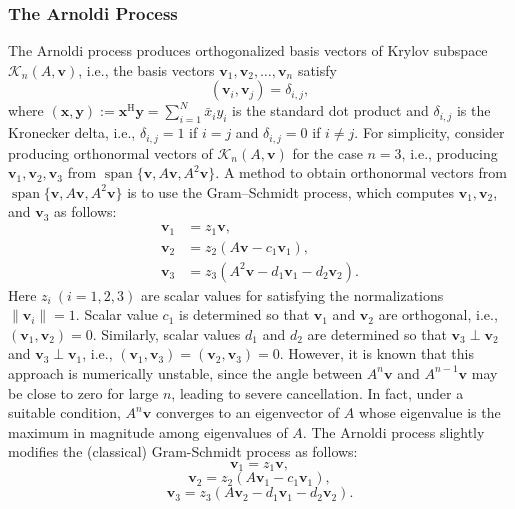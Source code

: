\subsubsection{{The Arnoldi Process}}\label{subsec:arnoldi-process}
{The Arnoldi process produces orthogonalized basis vectors of Krylov subspace $\mathcal K_n(A,\bm v)$, i.e., the basis vectors $\bm v_1,\bm v_2,\ldots,\bm v_n$ satisfy}
\[(\bm v_i,\bm v_j)=\delta_{i,j},\]
{where $(\bm x,\bm y):=\bm x^{\mathrm H}\bm y=\sum_{i=1}^N\bar x_i y_i$ is the standard dot product and $\delta_{i,j}$ is the Kronecker delta, i.e., $\delta_{i,j}=1$ if $i=j$ and $\delta_{i,j}=0$ if $i\ne j$.}
{For simplicity, consider producing orthonormal vectors of $\mathcal K_n(A,\bm v)$ for the case $n=3$, i.e., producing $\bm v_1,\bm v_2,\bm v_3$ from $\operatorname{span}\{\bm v,A\bm v,A^2\bm v\}$.}
{A method to obtain orthonormal vectors from $\operatorname{span}\{\bm v,A\bm v,A^2\bm v\}$ is to use the Gram--Schmidt process, which computes $\bm v_1,\bm v_2$, and $\bm v_3$ as follows:}
\[
\begin{aligned}
\bm v_1&=z_1\bm v,\\
\bm v_2&=z_2(A\bm v-c_1\bm v_1),\\
\bm v_3&=z_3(A^2\bm v-d_1\bm v_1-d_2\bm v_2).
\end{aligned}
\]
{Here $z_i\ (i=1,2,3)$ are scalar values for satisfying the normalizations $\|\bm v_i\|=1$. Scalar value $c_1$ is determined so that $\bm v_1$ and $\bm v_2$ are orthogonal, i.e., $(\bm v_1,\bm v_2)=0$. Similarly, scalar values $d_1$ and $d_2$ are determined so that $\bm v_3\perp\bm v_2$ and $\bm v_3\perp\bm v_1$, i.e., $(\bm v_1,\bm v_3)=(\bm v_2,\bm v_3)=0$. However, it is known that this approach is numerically unstable, since the angle between $A^n\bm v$ and $A^{n-1}\bm v$ may be close to zero for large $n$, leading to severe cancellation. In fact, under a suitable condition, $A^n\bm v$ converges to an eigenvector of $A$ whose eigenvalue is the maximum in magnitude among eigenvalues of $A$.}
{The Arnoldi process slightly modifies the (classical) Gram-Schmidt process as follows:}
\begin{equation}\label{eq:arnoldi-first-vector}\bm v_1=z_1\bm v,\end{equation}
\begin{equation}\label{eq:arnoldi-second-vector}\bm v_2=z_2(A\bm v_1-c_1\bm v_1),\end{equation}
\begin{equation}\label{eq:arnoldi-third-vector}\bm v_3=z_3(A\bm v_2-d_1\bm v_1-d_2\bm v_2).\end{equation}
